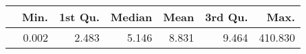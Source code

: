 \begin{table}[ht]
\centering
\begin{tabular}{rrrrrrr}
  \hline
 & Min. & 1st Qu. & Median & Mean & 3rd Qu. & Max. \\ 
  \hline
 & 0.002 & 2.483 & 5.146 & 8.831 & 9.464 & 410.830 \\ 
   \hline
\end{tabular}
\end{table}
